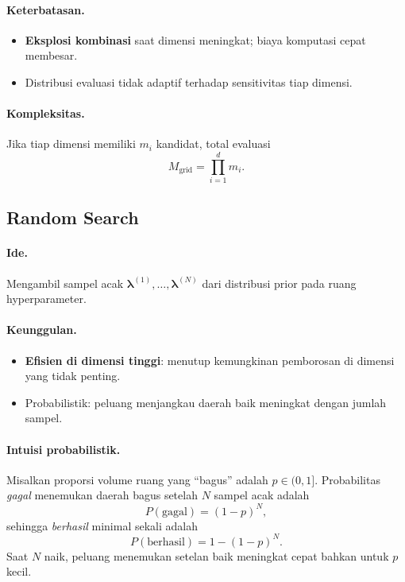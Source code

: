 \documentclass[11pt,a4paper]{article}
\begin{document}
\paragraph{Keterbatasan.}
\begin{itemize}[leftmargin=1.2em]
  \item \textbf{Eksplosi kombinasi} saat dimensi meningkat; biaya komputasi cepat membesar.
  \item Distribusi evaluasi tidak adaptif terhadap sensitivitas tiap dimensi.
\end{itemize}

\paragraph{Kompleksitas.}
Jika tiap dimensi memiliki $m_i$ kandidat, total evaluasi
\[
M_{\text{grid}} = \prod_{i=1}^{d} m_i.
\]

\subsection{Random Search}
\paragraph{Ide.} Mengambil sampel acak $\boldsymbol{\lambda}^{(1)},\dots,\boldsymbol{\lambda}^{(N)}$ dari distribusi prior pada ruang hyperparameter.

\paragraph{Keunggulan.}
\begin{itemize}[leftmargin=1.2em]
  \item \textbf{Efisien di dimensi tinggi}: menutup kemungkinan pemborosan di dimensi yang tidak penting.
  \item Probabilistik: peluang menjangkau daerah baik meningkat dengan jumlah sampel.
\end{itemize}

\paragraph{Intuisi probabilistik.} Misalkan proporsi volume ruang yang ``bagus'' adalah $p\in(0,1]$. Probabilitas \emph{gagal} menemukan daerah bagus setelah $N$ sampel acak adalah
\[
P(\text{gagal}) = (1-p)^N,
\]
sehingga \emph{berhasil} minimal sekali adalah
\[
P(\text{berhasil}) = 1 - (1-p)^N.
\]
Saat $N$ naik, peluang menemukan setelan baik meningkat cepat bahkan untuk $p$ kecil.
\end{document}
